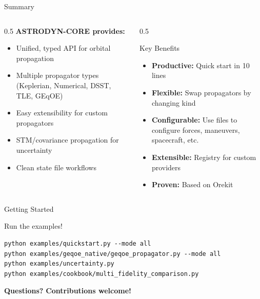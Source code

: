 \documentclass[aspectratio=169,12pt]{beamer}
\begin{document}
\begin{frame}{Summary}
    \begin{columns}
        \begin{column}{0.5\textwidth}
            \textbf{ASTRODYN-CORE provides:}
            \begin{itemize}
                \item Unified, typed API for orbital propagation
                \item Multiple propagator types (Keplerian, Numerical, DSST, TLE, GEqOE)
                \item Easy extensibility for custom propagators
                \item STM/covariance propagation for uncertainty
                \item Clean state file workflows
            \end{itemize}
        \end{column}
        \begin{column}{0.5\textwidth}
            \begin{block}{Key Benefits}
                \begin{itemize}
                    \item \textbf{Productive:} Quick start in 10 lines
                    \item \textbf{Flexible:} Swap propagators by changing kind
                    \item \textbf{Configurable:} Use files to configure forces, maneuvers, spacecraft, etc.
                    \item \textbf{Extensible:} Registry for custom providers
                    \item \textbf{Proven:} Based on Orekit
                \end{itemize}
            \end{block}
        \end{column}
    \end{columns}
\end{frame}

\begin{frame}[fragile]{Getting Started}
    \begin{center}
        \LARGE{Run the examples!}
    \end{center}
    
    \vspace{0.5cm}
    \begin{verbatim}
python examples/quickstart.py --mode all
python examples/geqoe_native/geqoe_propagator.py --mode all
python examples/uncertainty.py
python examples/cookbook/multi_fidelity_comparison.py
    \end{verbatim}
    
    \vspace{0.5cm}
    \begin{center}
        \textbf{Questions?} \hspace{1cm} \textbf{Contributions welcome!}
    \end{center}
\end{frame}
\end{document}
